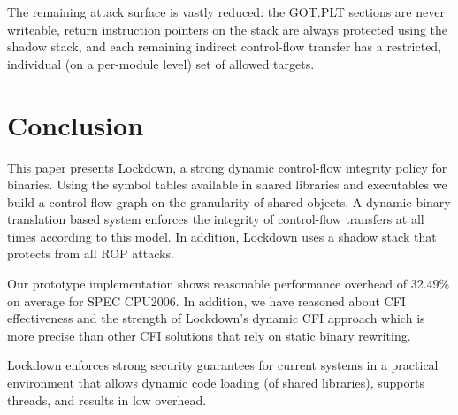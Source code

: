 \documentclass{acm_proc_article-sp}
\begin{document}
The remaining attack surface is vastly reduced: the GOT.PLT sections are never
writeable, return instruction pointers on the stack are always protected using
the shadow stack, and each remaining indirect control-flow transfer has a
restricted, individual (on a per-module level) set of allowed targets.





\section{Conclusion}\label{sec:conclusion}


This paper presents Lockdown, a strong dynamic control-flow integrity policy for
binaries. Using the symbol tables available in shared libraries and
executables we build a control-flow graph on the granularity of shared objects. A
dynamic binary translation based system enforces the integrity of control-flow
transfers at all times according to this model. In addition, Lockdown uses a
shadow stack that protects from all ROP attacks.

Our prototype implementation shows reasonable performance overhead of 32.49\% on
average for SPEC CPU2006. In addition, we have reasoned about CFI effectiveness
and the strength of Lockdown's dynamic CFI approach which is more precise than
other CFI solutions that rely on static binary rewriting.

Lockdown enforces strong security guarantees for current systems
in a practical environment that allows dynamic code loading (of shared
libraries), supports threads, and results in low overhead.

\newpage



  
\end{document}
